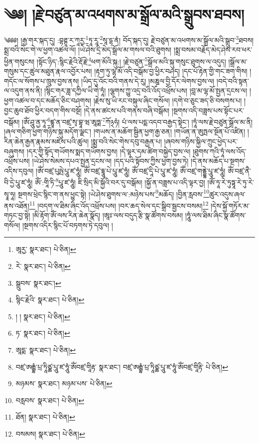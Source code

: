 \setcounter{footnote}{0} 
\chapter{༄༅། །རྗེ་བཙུན་མ་འཕགས་མ་སྒྲོལ་མའི་སྒྲུབས་ཐབས།}༄༅༅། །རྒྱ་གར་སྐད་དུ། :བྷཊྚཱ་ར་ཀཱརྱ་\footnote{ཨཱརྱ་  སྣར་ཐང་།  པེ་ཅིན། }ཏཱ་རཱ་\footnote{རེ་  སྣར་ཐང་།  པེ་ཅིན། }སཱ་དྷ་ནཾ། བོད་སྐད་དུ། རྗེ་བཙུན་མ་འཕགས་མ་སྒྲོལ་མའི་སྒྲུབ་\footnote{སྒྲུབས་  སྣར་ཐང་། }ཐབས། སྨྲ་བའི་སེང་གེ་ལ་ཕྱག་འཚལ་ལོ། །ཡེ་ཤེས་དྲི་མེད་སྒྲོལ་མ་གསལ་བའི་ཐུགས། །སྨྲ་བསམ་བརྗོད་མེད་ཤེས་རབ་ཕར་ཕྱིན་གསུངས། །སྟོང་ཉིད་:སྙིང་རྗེའི་རྡོ་རྗེ་\footnote{སྙིང་རྗེའི་  སྣར་ཐང་།  པེ་ཅིན། }ཕག་མོའི་སྐུ:། །རྗེ་བཙུན་\footnote{། །  སྣར་ཐང་།  པེ་ཅིན། }སྒྲོལ་མའི་སྐུ་གསུང་ཐུགས་ལ་འདུད། །སྒྲོལ་མ་གསུམ་དང་ཚུལ་མཐུན་རྣལ་འབྱོར་པས། །རྟག་ཏུ་ལྷ་མོ་འདི་བསྒོམ་བྱ་ཕྱིར་བཤད། །དང་པོ་རྟེན་གྱི་གང་ཟག་གིས། །གདོང་ལ་སོགས་པ་ཁྲུས་བྱས་ནས། །ཡིད་དུ་འོང་བའི་གནས་དེ་རུ། །མཎྜལ་བྱི་དོར་ལེགས་བྱས་ལ། །བདེ་བའི་སྟན་ལ་འདུག་ནས་ནི། །སྙིང་གར་ཟླ་དཀྱིལ་ཡི་གེ་ཏཱཾ། །ལྕགས་ཀྱུ་འདྲ་བའི་འོད་འཕྲོས་པས། །བླ་མ་ལྷ་མོ་སྤྱན་དྲངས་ལ། །ཕྱག་འཚལ་བ་དང་མཆོད་ཅིང་བཤགས། །རྗེས་སུ་ཡི་རང་བསྐུལ་ཞིང་གསོལ། །དགེ་བ་ཅུང་ཟད་ཅི་བསགས་པ། །བྱང་ཆུབ་ཐོབ་ཕྱིར་བདག་གིས་བསྔོ། །དེ་ནས་ཚངས་པའི་གནས་བཞི་བསྒོམ། །སྔགས་འདི་བཟླས་པས་སྟོང་པར་བསྒོམ། །ཨོཾ་ཤཱུ་ནྱ་ཏཱ་\footnote{ཏ་  སྣར་ཐང་།  པེ་ཅིན། }ཛྙཱ་ན་བཛྲ་སྭ་བྷཱ་ཝ་ཨཱཏྨ་\footnote{ཨཱདྨ་  སྣར་ཐང་།  པེ་ཅིན། }ཀོ྅ཧཾ། པཾ་ལས་པདྨ་འདབ་བརྒྱད་སྟེང་། །ཏཱཾ་ལས་རྗེ་བཙུན་སྒྲོལ་མ་ནི། །ཞལ་གཅིག་ཕྱག་གཉིས་སྐུ་མདོག་ལྗང་། །གཡས་ན་མཆོག་སྦྱིན་ཕྱག་རྒྱ་ཅན། །གཡོན་ན་ཨུཏྤལ་སྔོན་པོ་འཛིན། །རིན་ཆེན་རྒྱན་རྣམས་མཛེས་པའི་ཚུལ། །སྨྲ་བའི་སེང་གེས་དབུ་བརྒྱན་པ། །ཞབས་གཉིས་སྐྱིལ་ཀྲུང་ཕྱེད་པར་བཞུགས། །དར་གྱི་སྟོད་གཡོགས་སྨད་གཡོགས་བྱས། །དེ་ལྟར་དམ་ཚིག་བསྐྱེད་བྱས་ལ། །ཐུགས་ཀའི་ཏཱཾ་ལས་འོད་འཕྲོས་པས། །ཡེ་ཤེས་སེམས་དཔའ་སྤྱན་དྲངས་ལ། །དད་པའི་སྟོབས་ཀྱིས་ཕྱག་བྱས་ཏེ། །དེ་ནས་མཆོད་པ་སྔགས་འདིས་དབུལ། །ཨོཾ་བཛྲ་པུཥྤེ་པཱུ་ཛ་ཧཱུཾ། ཨོཾ་བཛྲ་དྷཱུ་པེ་པཱུ་ཛ་ཧཱུཾ། ཨོཾ་བཛྲ་དཱི་པེ་པཱུ་ཛ་ཧཱུཾ། ཨོཾ་བཛྲ་གནྡྷེ་པཱུ་ཛ་ཧཱུཾ། ཨོཾ་བཛྲ་ནཻ་བི་དྱེ་པཱུ་ཛ་ཧཱུཾ། ཨོཾ་:གཱི་ཏི་\footnote{བཛྲ་ཨརྒྷཾ་པྲ་ཏཱིཙྪ་པཱུ་ཛ་ཧཱུཾ་ཨོཾབཛྲ་གཱིརྟ་  སྣར་ཐང་། བཛྲ་ཨརྒྷཾ་པྲ་ཏཱིཙྪ་པཱུ་ཛ་ཧཱུཾ་ཨོཾབཛྲ་གཱིརྟི་  པེ་ཅིན། }པཱུ་ཛ་ཧཱུཾ། ཇི་སྲིད་མི་སྐྱོའི་བར་དུ་བསྒོམ། །སྐྱོ་ན་བཟླས་པ་འདི་ལྟར་བྱ། །ཨོཾ་ཏཱ་རེ་ཏུཏྟཱ་རེ་ཏུ་རེ་སྭཱ་ཧཱ། སྔགས་ཕྲེང་སྙིང་ག་ནས་ཕྱུང་སྟེ། །ཡེ་ཤེས་ཐུགས་ལ་:མཉེས་པས་\footnote{མཉམས་  སྣར་ཐང་། མཉམ་པས་  པེ་ཅིན། }མཆོད། །བྱིན་རླབས་\footnote{བརླབས་  སྣར་ཐང་།  པེ་ཅིན། }ཚུར་འདུས་ཞལ་ནས་འཐོན།\footnote{ཐོན།  སྣར་ཐང་།  པེ་ཅིན། } །བདག་ལ་ཐིམ་ཞིང་འོད་འཕྲོས་པས། །བར་ཆད་སེལ་དང་སྒྲིབ་སྦྱངས་བསམ།\footnote{བསམས།  སྣར་ཐང་།  པེ་ཅིན། } །དེས་སྐྱོ་གཏོར་མ་གཏང་བྱ་སྟེ། །མི་རྟོག་ཨོཾ་ལས་རིན་ཆེན་སྣོད། །ཨཱཿ་ལས་བདུད་རྩི་སྣ་ཚོགས་བསམ། །ཧཱུཾ་ལས་ཐིམ་ཞིང་སྣ་ཚོགས་གསོལ། །སྔགས་འདིར་སྙིང་པོ་བཏགས་ཏེ་དབུལ། །
